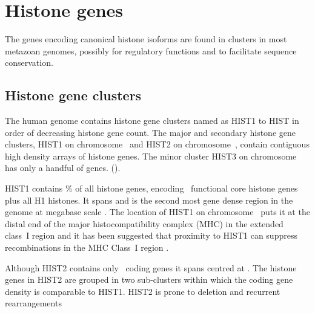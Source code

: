 \section{Histone genes}

  The genes encoding canonical histone isoforms are found in clusters in most metazoan genomes, 
  possibly for regulatory functions and to facilitate sequence conservation.

  \subsection{Histone gene clusters}
    The human genome contains  histone gene clusters 
	named as HIST1 to HIST in order of decreasing histone gene count.
    The major and secondary histone gene clusters,
    HIST1 on chromosome~\HISTOneLocus{} and HIST2 on chromosome~\HISTTwoLocus{},
    contain contiguous high density arrays of histone genes.
	The minor cluster HIST3 on chromosome~\HISTThreeLocus{} has only a handful of genes.
    ().

    HIST1 contains \% of all histone genes, 
	encoding \CodingGenesInHISTOne{}~functional core histone genes plus all H1 histones. 
	It spans \HISTOneSpan{} and is the second most gene dense region in the genome at megabase scale \citep{MHC-III-analysis}. 
	The location of HIST1 on chromosome~\HISTOneLocus{}
	puts it at the distal end of the major histocompatibility complex (MHC) in the extended class~I region \citep{MHC-I-transcript, MHC-complete-sequencing-1999} 
	and it has been suggested that proximity to HIST1 can suppress recombinations in the MHC Class~I region \citep{MHC-repressed-by-HIST}.

    Although HIST2 contains only \CodingGenesInHISTTwo{}~coding genes it spans \HISTTwoSpan{} centred at \HISTTwoLocus{}.
	The histone genes in HIST2 are grouped in two sub-clusters 
	within which the coding gene density is comparable to HIST1.
    HIST2 is prone to deletion and recurrent rearrangements \citep{HISTTwo-prone-deletion-discovery, HISTTwo-prone-deletion-focus}

